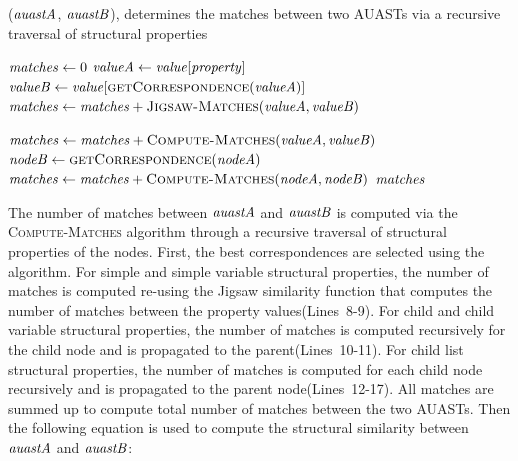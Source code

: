 \begin{algorithm}
  \caption{($\mathit{auastA}$, $\mathit{auastB}$), determines the matches between two AUASTs via a recursive traversal of structural properties}
  \label{computeMatches}
  \begin{algorithmic}[1]
  \ComputeMatch
  	   \EndIf
         \State $\mathit{matches} \gets 0$
	\State $\mathit{valueA} \gets \mathit{value}[\mathit{property}]$
	\State $\mathit{valueB} \gets \mathit{value}[\textsc{getCorrespondence}(\mathit{valueA})]$
 \State $\mathit{matches} \gets  \mathit{matches} + \textsc{Jigsaw-Matches}(\mathit{valueA}, \mathit{valueB})$ 	
	
	          \State $\mathit{matches} \gets  \mathit{matches} +\textsc{Compute-Matches}(\mathit{valueA},\mathit{valueB})$		
		\State $\mathit{nodeB} \gets \textsc{getCorrespondence}(\mathit{nodeA})$
	 \State $\mathit{matches} \gets  \mathit{matches} + \textsc{Compute-Matches}(\mathit{nodeA}, \mathit{nodeB})$
	  \EndFor 	
	   \EndIf
       \EndFor 	
	\Return $\mathit{matches}$
  \end{algorithmic}
\end{algorithm}


The number of matches between $\mathit{auastA}$ and $\mathit{auastB}$ is computed via the \textsc{Compute-Matches} algorithm through a recursive traversal of structural properties of the nodes. First, the best correspondences are selected using the  algorithm. For simple and simple variable structural properties, the number of matches is computed re-using the Jigsaw similarity function that computes the number of matches between the property values(Lines~8-9). For child and child variable structural properties, the number of matches is computed recursively for the child node and is propagated to the parent(Lines~10-11). For child list structural properties, the number of matches is computed for each child node recursively and is propagated to the parent node(Lines~12-17). All matches are summed up to compute total number of matches between the two AUASTs. Then the following equation is used to compute the structural similarity between $\mathit{auastA}$ and $\mathit{auastB}$:

